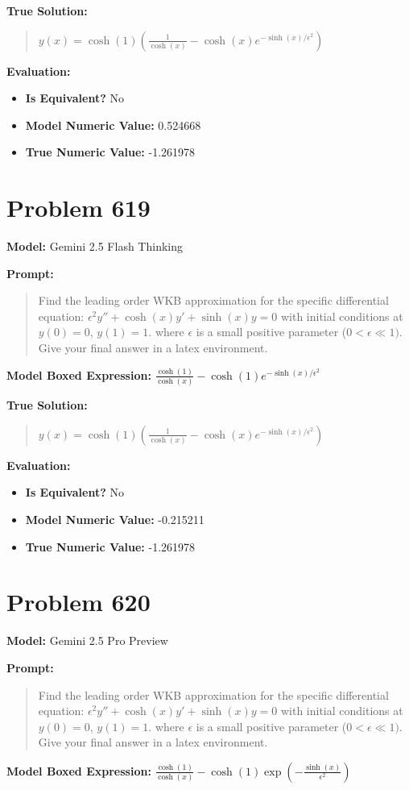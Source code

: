 \documentclass{article}
\begin{document}
\textbf{True Solution:}
\begin{quote}
$y(x) = \cosh(1)(\frac{1}{\cosh(x)} - \cosh(x) e^{-\sinh(x)/\epsilon^2})$
\end{quote}

\textbf{Evaluation:}
\begin{itemize}
\item \textbf{Is Equivalent?} No
\item \textbf{Model Numeric Value:} 0.524668
\item \textbf{True Numeric Value:} -1.261978
\end{itemize}
\vspace{1cm}
\section*{Problem 619}
\textbf{Model:} Gemini 2.5 Flash Thinking

\textbf{Prompt:}
\begin{quote}
Find the leading order WKB approximation for the specific differential equation: $\epsilon^2 y'' + \cosh(x) y' + \sinh(x) y = 0$ with initial conditions at $y(0) = 0$, $y(1) = 1$. where $\epsilon$ is a small positive parameter ($0 < \epsilon \ll 1)$. Give your final answer in a \boxed latex environment.
\end{quote}
\textbf{Model Boxed Expression:} $\frac{\cosh(1)}{\cosh(x)} - \cosh(1) e^{-\sinh(x)/\epsilon^2}$

\textbf{True Solution:}
\begin{quote}
$y(x) = \cosh(1)(\frac{1}{\cosh(x)} - \cosh(x) e^{-\sinh(x)/\epsilon^2})$
\end{quote}

\textbf{Evaluation:}
\begin{itemize}
\item \textbf{Is Equivalent?} No
\item \textbf{Model Numeric Value:} -0.215211
\item \textbf{True Numeric Value:} -1.261978
\end{itemize}
\vspace{1cm}
\section*{Problem 620}
\textbf{Model:} Gemini 2.5 Pro Preview

\textbf{Prompt:}
\begin{quote}
Find the leading order WKB approximation for the specific differential equation: $\epsilon^2 y'' + \cosh(x) y' + \sinh(x) y = 0$ with initial conditions at $y(0) = 0$, $y(1) = 1$. where $\epsilon$ is a small positive parameter ($0 < \epsilon \ll 1)$. Give your final answer in a \boxed latex environment.
\end{quote}
\textbf{Model Boxed Expression:} $\frac{\cosh(1)}{\cosh(x)} - \cosh(1)\exp\left(-\frac{\sinh(x)}{\epsilon^2}\right)$
\end{document}
